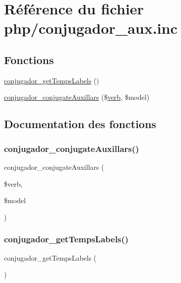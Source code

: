 \hypertarget{php_2conjugador__aux_8inc}{}\section{Référence du fichier php/conjugador\+\_\+aux.inc}
\label{php_2conjugador__aux_8inc}
\subsection*{Fonctions}
\begin{DoxyCompactItemize}
\item 
\hyperlink{php_2conjugador__aux_8inc_a801a76b62499e2f4a721fe28c13acf88}{conjugador\+\_\+get\+Temps\+Labels} ()
\item 
\hyperlink{php_2conjugador__aux_8inc_a8d8c244688cc069920895b0ac91a3cfa}{conjugador\+\_\+conjugate\+Auxillars} (\$\hyperlink{teibase_8php_aa8d8fadfcf4239c7aa288414da9d0ace}{verb}, \$model)
\end{DoxyCompactItemize}


\subsection{Documentation des fonctions}
\hypertarget{php_2conjugador__aux_8inc_a8d8c244688cc069920895b0ac91a3cfa}{}\label{php_2conjugador__aux_8inc_a8d8c244688cc069920895b0ac91a3cfa} 
\subsubsection{\texorpdfstring{conjugador\+\_\+conjugate\+Auxillars()}{conjugador\_conjugateAuxillars()}}
{\footnotesize\ttfamily conjugador\+\_\+conjugate\+Auxillars (\begin{DoxyParamCaption}\item[{}]{\$verb,  }\item[{}]{\$model }\end{DoxyParamCaption})}

\hypertarget{php_2conjugador__aux_8inc_a801a76b62499e2f4a721fe28c13acf88}{}\label{php_2conjugador__aux_8inc_a801a76b62499e2f4a721fe28c13acf88} 
\subsubsection{\texorpdfstring{conjugador\+\_\+get\+Temps\+Labels()}{conjugador\_getTempsLabels()}}
{\footnotesize\ttfamily conjugador\+\_\+get\+Temps\+Labels (\begin{DoxyParamCaption}{ }\end{DoxyParamCaption})}

